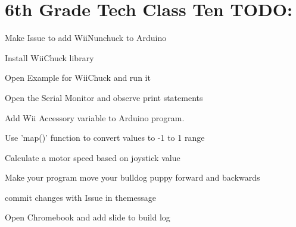 \documentclass{article}
\begin{document}
\section{6th Grade Tech Class Ten TODO:}
\begin{todolist}
	\item Make Issue to add WiiNunchuck to Arduino
	\item Install WiiChuck library
	\item Open Example for WiiChuck and run it
	\item Open the Serial Monitor and observe print statements
	\item Add Wii Accessory variable to Arduino program. 
	\item Use 'map()' function to convert values to -1 to 1 range
	\item Calculate a motor speed based on joystick value
	\item Make your program move your bulldog puppy forward and backwards
	\item commit changes with Issue in themessage
	\item Open Chromebook and add slide to build log
\end{todolist}
\end{document}
